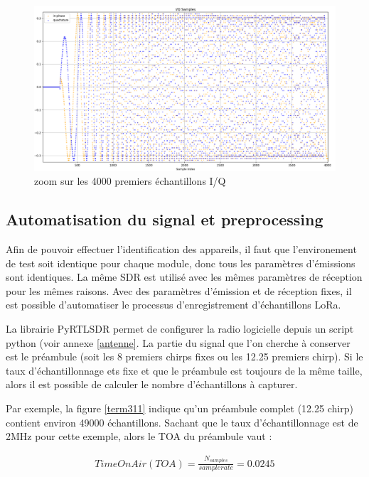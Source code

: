 \newpage

\begin{figure}[h]
\centering

\includegraphics[scale=0.13]{images/iq2.png}
\caption{zoom sur les 4000 premiers échantillons I/Q}\label{term310}
\end{figure}

\subsection{Automatisation du signal et preprocessing}

Afin de pouvoir effectuer l'identification des appareils, il faut que l'environement de test soit identique pour chaque module, donc tous les paramètres d'émissions sont identiques. La même SDR est utilisé avec les mêmes paramètres de réception pour les mêmes raisons. Avec des paramètres d'émission et de réception fixes, il est possible d'automatiser le processus d'enregistrement d'échantillons LoRa.

La librairie PyRTLSDR permet de configurer la radio logicielle depuis un script python (voir annexe \ref{antenne}. La partie du signal que l'on cherche à conserver est le préambule (soit les 8 premiers chirps fixes ou les 12.25 premiers chirp). Si le taux d'échantillonnage ets fixe et que le préambule est toujours de la même taille, alors il est possible de calculer le nombre d'échantillons à capturer. 

Par exemple, la figure \ref{term311} indique qu'un préambule complet (12.25 chirp) contient environ 49000 échantillons. Sachant que le taux d'échantillonnage est de 2MHz pour cette exemple, alors le TOA du préambule vaut :

\begin{align}\label{toa}
    Time On Air (TOA) = \frac{N_{samples}}{sample rate} = 0.0245
\end{align}

